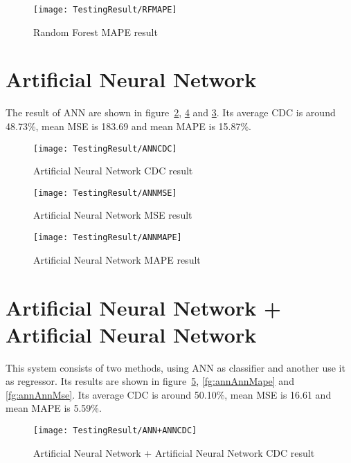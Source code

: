 \begin{figure}[h]
	\centering
	\texttt{[image: TestingResult/RFMAPE]}
	\caption{Random Forest MAPE result}
	\label{fg:rtMape}
\end{figure}

\clearpage

\section{Artificial Neural Network}

The result of ANN are shown in figure~\ref{fg:annCdc}, \ref{fg:annMape} and \ref{fg:annMse}. Its average CDC is around 48.73\%, mean MSE is 183.69 and mean MAPE is 15.87\%.

\begin{figure}[h]
	\centering
	\texttt{[image: TestingResult/ANNCDC]}
	\caption{Artificial Neural Network CDC result}
	\label{fg:annCdc}
\end{figure}

\begin{figure}[h]
	\centering
	\texttt{[image: TestingResult/ANNMSE]}
	\caption{Artificial Neural Network MSE result}
	\label{fg:annMse}
\end{figure}

\begin{figure}[h]
	\centering
	\texttt{[image: TestingResult/ANNMAPE]}
	\caption{Artificial Neural Network MAPE result}
	\label{fg:annMape}
\end{figure}

\clearpage

\section{Artificial Neural Network + Artificial Neural Network}

This system consists of two methods, using ANN as classifier and another use it as regressor. Its results are shown in figure~\ref{fg:annAnnCdc}, \ref{fg:annAnnMape} and \ref{fg:annAnnMse}. Its average CDC is around 50.10\%, mean MSE is 16.61 and mean MAPE is 5.59\%.

\begin{figure}[h]
	\centering
	\texttt{[image: TestingResult/ANN+ANNCDC]}
	\caption{Artificial Neural Network + Artificial Neural Network CDC result}
	\label{fg:annAnnCdc}
\end{figure}

